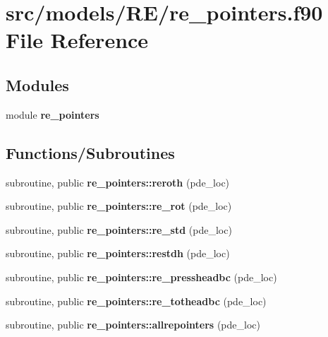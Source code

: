 \section{src/models/\+R\+E/re\+\_\+pointers.f90 File Reference}
\label{re__pointers_8f90}
\subsection*{Modules}
\begin{DoxyCompactItemize}
\item 
module {\bf re\+\_\+pointers}
\end{DoxyCompactItemize}
\subsection*{Functions/\+Subroutines}
\begin{DoxyCompactItemize}
\item 
subroutine, public {\bf re\+\_\+pointers\+::reroth} (pde\+\_\+loc)
\item 
subroutine, public {\bf re\+\_\+pointers\+::re\+\_\+rot} (pde\+\_\+loc)
\item 
subroutine, public {\bf re\+\_\+pointers\+::re\+\_\+std} (pde\+\_\+loc)
\item 
subroutine, public {\bf re\+\_\+pointers\+::restdh} (pde\+\_\+loc)
\item 
subroutine, public {\bf re\+\_\+pointers\+::re\+\_\+pressheadbc} (pde\+\_\+loc)
\item 
subroutine, public {\bf re\+\_\+pointers\+::re\+\_\+totheadbc} (pde\+\_\+loc)
\item 
subroutine, public {\bf re\+\_\+pointers\+::allrepointers} (pde\+\_\+loc)
\end{DoxyCompactItemize}
